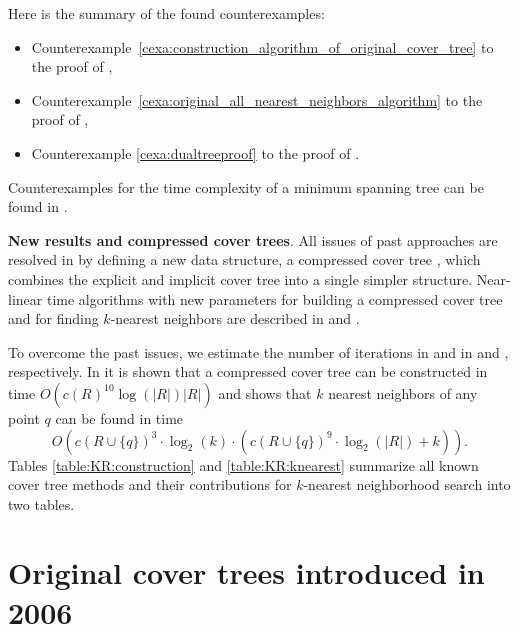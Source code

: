 \documentclass{vgtc}                          %
\numberwithin{algocf}{section}
\theoremstyle{definition}
\theoremstyle{definition}
\theoremstyle{definition}
\theoremstyle{plain}
\begin{document}
Here is the summary of the found counterexamples:
\begin{itemize}
\item Counterexample~\ref{cexa:construction_algorithm_of_original_cover_tree} to the proof of \cite[Theorem~2]{beygelzimer2006cover}, 
\item Counterexample~\ref{cexa:original_all_nearest_neighbors_algorithm} to the proof of \cite[Theorem~1]{beygelzimer2006cover},
\item Counterexample \ref{cexa:dualtreeproof} to the proof of \cite[Theorem~3.1]{ram2009linear}.
\end{itemize}

\noindent
Counterexamples for the time complexity of a minimum spanning tree \cite[Theorem~5.1]{march2010fast} can be found in \cite[Section~4.2]{2205.10194}.
\medskip

\noindent
\textbf{New results and compressed cover trees}.
All issues of past approaches are resolved in \cite[Chapter~3]{2205.10194} by defining a new data structure, a compressed cover tree \cite[Definition~3.5]{2205.10194}, which combines the explicit and implicit cover tree into a single simpler structure.
Near-linear time algorithms with new parameters for building a  compressed cover tree and for finding $k$-nearest neighbors are described in \cite[Algorithm~3.5.3]{2205.10194} and \cite[Algorithm~3.7.2]{2205.10194}. 
\medskip

\noindent
To overcome the past issues, we estimate the number of iterations in
\cite[Algorithm~3.5.4]{2205.10194} and \cite[Algorithm~3.7.2]{2205.10194} in 
\cite[Lemma~3.5.9]{2205.10194} and \cite[Lemma~3.7.13]{2205.10194} , respectively.
In \cite[Corollary~3.5.11]{2205.10194} it is shown that a compressed cover tree can be constructed in time $O(c(R)^{10}\log(|R|)|R|)$ and \cite[Theorem~3.7.14]{2205.10194} shows that $k$ nearest neighbors of any point $q$ can be found in time  $$O(c(R \cup \{q\})^3 \cdot \log_2(k) \cdot (c(R \cup \{q\})^9 \cdot \log_2(|R|) + k)).$$
Tables \ref{table:KR:construction} and \ref{table:KR:knearest} summarize all known cover tree methods and their contributions for $k$-nearest neighborhood search into two tables. 
\medskip


\section{Original cover trees introduced in 2006}
\label{sec:original_cover_trees}
\end{document}

